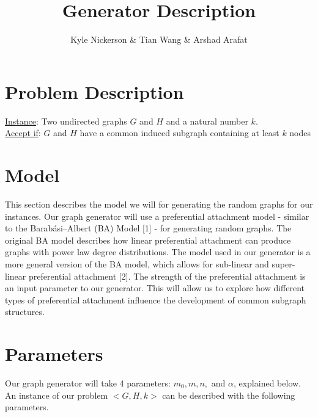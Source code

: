 \documentclass{article}
\title{Generator Description}
\author{Kyle Nickerson & Tian Wang & Arshad Arafat  }
\begin{document}
\maketitle

\section{Problem Description}


\noindent
\underline{Instance}: Two undirected graphs $G$ and $H$ and a natural number $k$.
\\
\underline{Accept if}: $G$ and $H$ have a common induced subgraph containing at least $k$ nodes




\section{Model}
This section describes the model we will for generating the random graphs for our instances.
Our graph generator will use a preferential attachment model - similar to the Barabási–Albert (BA) Model [1] - for generating random graphs. The original BA model describes how linear preferential attachment can produce graphs with power law degree distributions. The model used in our generator is a more general version of the BA model, which allows for sub-linear and super-linear preferential attachment [2]. The strength of the preferential attachment is an input parameter to our generator. This will allow us to explore how different types of preferential attachment influence the development of common subgraph structures. 

\section{Parameters}
Our graph generator will take 4 parameters: $m_0, m, n, $ and $ \alpha $, explained below. 
An instance of our problem $<G,H,k>$ can be described with the following parameters. 
\end{document}
